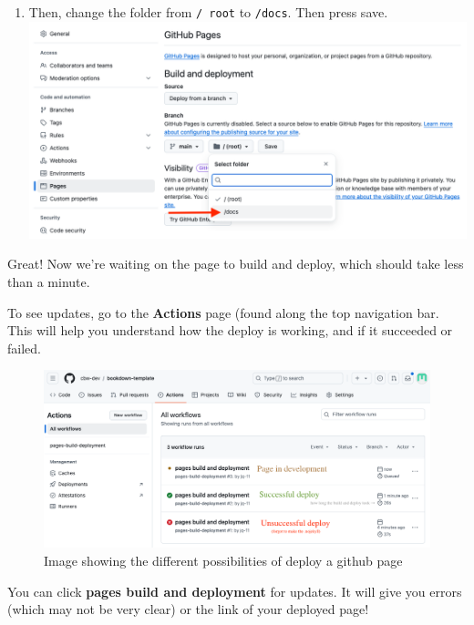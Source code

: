 \documentclass[
]{book}
\theoremstyle{definition}
\theoremstyle{definition}
\theoremstyle{definition}
\theoremstyle{definition}
\theoremstyle{remark}
\begin{document}
\begin{enumerate}
\item
  Then, change the folder from \texttt{/\ root} to \texttt{/docs}. Then press save.
  \includegraphics{img/git-instruct/github-deploy-docs.png}
\end{enumerate}

Great! Now we're waiting on the page to build and deploy, which should take less than a minute.

To see updates, go to the \textbf{Actions} page (found along the top navigation bar. This will help you understand how the deploy is working, and if it succeeded or failed.

\begin{figure}
\centering
\includegraphics{img/git-instruct/github-pages-actions-explained.png}
\caption{Image showing the different possibilities of deploy a github page}
\end{figure}

You can click \textbf{pages build and deployment} for updates. It will give you errors (which may not be very clear) or the link of your deployed page!
\end{document}
